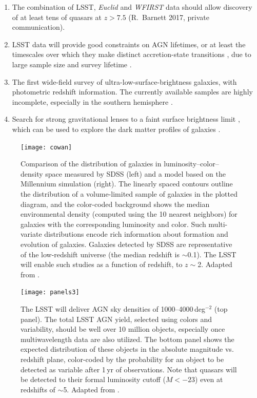 \begin{enumerate}
\item The combination of LSST, \textit{Euclid} and \textit{WFIRST} data should allow discovery of at least
       tens of quasars at $z>7.5$ (R.\ Barnett 2017, private communication).

\item LSST data will provide good constraints on AGN lifetimes, or at least the timescales over which
         they make distinct accretion-state transitions \citep{2016MNRAS.457..389M}, due to large sample
         size and survey lifetime \citep[e.g.][]{2003ApJ...597L.109M}.

\item The first wide-field survey of ultra-low-surface-brightness galaxies, with
      photometric redshift information. The currently available
      samples \citep[e.g.][]{2018ApJ...857..104G} are highly
      incomplete, especially in the southern hemisphere \citep[see Figure~7 in][]{2007ApJ...654..897B}.

\item Search for strong gravitational lenses to a faint surface
  brightness limit \citep[e.g.][]{1998A&A...330....1B,1998ApJ...498L.107T,2007ApJ...671L...9B}, which can be used to
  explore the dark matter profiles of galaxies \citep[e.g.,][]{2006ApJ...640..662T}.
\end{enumerate}


\begin{figure}
\texttt{[image: cowan]}
\caption{Comparison of the distribution of galaxies in
luminosity--color--density space measured by SDSS (left) and a model based
on the Millennium simulation (right). The linearly spaced contours outline
the distribution of a volume-limited sample of galaxies in the plotted diagram, and
the color-coded background shows the median environmental density (computed
using the 10 nearest neighbors) for galaxies
with the corresponding luminosity and color. Such multi-variate distributions
encode rich information about formation and evolution of galaxies. Galaxies
detected by SDSS are representative of the low-redshift universe (the median
redshift is $\sim$0.1). The LSST will enable such studies as a function of
redshift, to $z\sim$2. Adapted from \citet{2008ApJ...674L..13C}.}
\label{Fig:cowan}
\end{figure}


\begin{figure}
\texttt{[image: panels3]}
\caption{The LSST will deliver AGN sky densities of 1000--4000\,deg$^{-2}$ (top panel).
The total LSST AGN yield, selected using colors and variability, should be well over
10 million objects, especially once multiwavelength data are also utilized.
The bottom panel shows the expected distribution of these objects in the
absolute magnitude vs. redshift plane, color-coded by the probability for
an object to be
detected as variable after 1\,yr of observations. Note that quasars will
be detected to their formal luminosity cutoff ($M< -23$) even at redshifts
of $\sim$5. Adapted from \citet{2007AAS...21113709B}.}
\label{Fig:panels3}
\end{figure}

